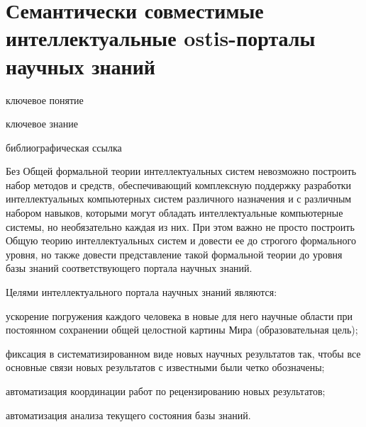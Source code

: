 \section{Семантически совместимые интеллектуальные ostis-порталы научных знаний}
{\label{sec_ostis_scientific_portal}} 

\begin{SCn}

\bigskip

\begin{scnrelfromlist}{ключевое понятие}
\end{scnrelfromlist}

\bigskip

\begin{scnrelfromlist}{ключевое знание}
\end{scnrelfromlist}

\bigskip

\begin{scnrelfromlist}{библиографическая ссылка}
\end{scnrelfromlist}

\end{SCn}


Без Общей формальной теории интеллектуальных систем невозможно построить набор методов и средств, обеспечивающий комплексную поддержку разработки интеллектуальных компьютерных систем различного назначения и с различным набором навыков, которыми могут обладать интеллектуальные компьютерные системы, но необязательно каждая из них. 
При этом важно не просто построить Общую теорию интеллектуальных систем и довести ее до строгого формального уровня, но также довести представление такой формальной теории до уровня базы знаний соответствующего портала научных знаний.

Целями интеллектуального портала научных знаний являются:
\begin{textitemize}
    \item ускорение погружения каждого человека в новые для него научные области при постоянном сохранении общей целостной картины Мира (образовательная цель);
    \item фиксация в систематизированном виде новых научных результатов так, чтобы все основные связи новых результатов с известными были четко обозначены;
    \item автоматизация координации работ по рецензированию новых результатов;
    \item автоматизация анализа текущего состояния базы знаний.
\end{textitemize}

